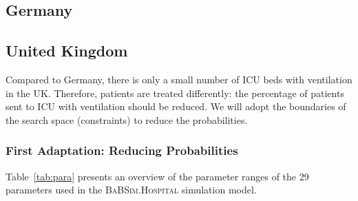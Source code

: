 \documentclass[conference]{IEEEtran}
\newcommand{\babsimhospital}{\textsc{BaBSim.Hospital}\xspace}
\begin{document}
\subsection{Germany}



\subsection{United Kingdom}
Compared to Germany, there is only a small number of ICU beds with ventilation in the UK.
Therefore, patients are treated differently: the percentage of patients sent to \gls{ICU} with ventilation should be reduced.
We will adopt the boundaries of the search space (constraints) to reduce the probabilities.

\subsubsection{First Adaptation: Reducing Probabilities}
Table~\ref{tab:para} presents an overview of the parameter ranges of the 29 parameters used in the \babsimhospital simulation model.
\end{document}
